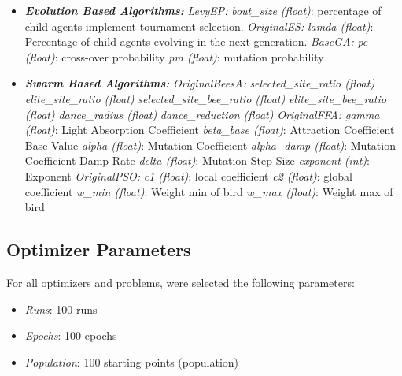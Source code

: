 \documentclass[conference]{IEEEtran}
\begin{document}
\begin{itemize}
    \item \textit{\textbf{Evolution Based Algorithms: }}
        \subitem \textit{LevyEP:}
            \subsubitem \textit{bout\_size (float)}: percentage of child agents implement tournament selection.
        \subitem \textit{OriginalES:}
            \subsubitem \textit{lamda (float)}: Percentage of child agents evolving in the next generation.
        \subitem \textit{BaseGA:}
            \subsubitem \textit{pc (float)}: cross-over probability
            \subsubitem \textit{pm (float)}: mutation probability
    \item \textit{\textbf{Swarm Based Algorithms: }}
        \subitem \textit{OriginalBeesA:}
            \subsubitem \textit{selected\_site\_ratio (float)}
            \subsubitem \textit{elite\_site\_ratio (float)}
            \subsubitem \textit{selected\_site\_bee\_ratio (float)}
            \subsubitem \textit{elite\_site\_bee\_ratio (float)}
            \subsubitem \textit{dance\_radius (float)}
            \subsubitem \textit{dance\_reduction (float)}
        \subitem \textit{OriginalFFA:}
            \subsubitem \textit{gamma (float)}: Light Absorption Coefficient
            \subsubitem \textit{beta\_base (float)}: Attraction Coefficient Base Value
            \subsubitem \textit{alpha (float)}: Mutation Coefficient
            \subsubitem \textit{alpha\_damp (float)}: Mutation Coefficient Damp Rate
            \subsubitem \textit{delta (float)}: Mutation Step Size
            \subsubitem \textit{exponent (int)}: Exponent
        \subitem \textit{OriginalPSO:}
            \subsubitem \textit{c1 (float)}: local coefficient
            \subsubitem \textit{c2 (float)}: global coefficient
            \subsubitem \textit{w\_min (float)}: Weight min of bird
            \subsubitem \textit{w\_max (float)}: Weight max of bird

\end{itemize}

\subsection{Optimizer Parameters}
\label{subsec:methodology-optimizer-parameters}

For all optimizers and problems, were selected the following parameters:

\begin{itemize}
    \item \textit{Runs}: 100 runs
    \item \textit{Epochs}: 100 epochs
    \item \textit{Population}: 100 starting points (population)
\end{itemize}
\end{document}

